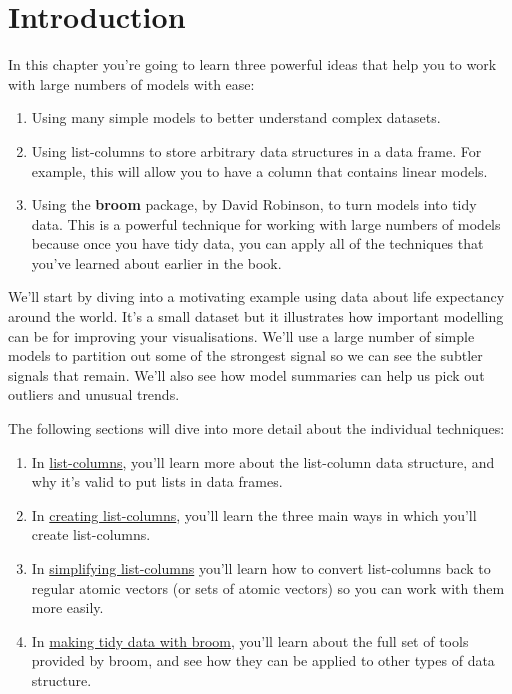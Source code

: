 \documentclass[]{book}
\begin{document}
\section{Introduction}\label{introduction-17}

In this chapter you're going to learn three powerful ideas that help you
to work with large numbers of models with ease:

\begin{enumerate}
\def\labelenumi{\arabic{enumi}.}
\item
  Using many simple models to better understand complex datasets.
\item
  Using list-columns to store arbitrary data structures in a data frame.
  For example, this will allow you to have a column that contains linear
  models.
\item
  Using the \textbf{broom} package, by David Robinson, to turn models
  into tidy data. This is a powerful technique for working with large
  numbers of models because once you have tidy data, you can apply all
  of the techniques that you've learned about earlier in the book.
\end{enumerate}

We'll start by diving into a motivating example using data about life
expectancy around the world. It's a small dataset but it illustrates how
important modelling can be for improving your visualisations. We'll use
a large number of simple models to partition out some of the strongest
signal so we can see the subtler signals that remain. We'll also see how
model summaries can help us pick out outliers and unusual trends.

The following sections will dive into more detail about the individual
techniques:

\begin{enumerate}
\def\labelenumi{\arabic{enumi}.}
\item
  In \protect\hyperlink{list-columns-1}{list-columns}, you'll learn more
  about the list-column data structure, and why it's valid to put lists
  in data frames.
\item
  In \protect\hyperlink{creating-list-columns}{creating list-columns},
  you'll learn the three main ways in which you'll create list-columns.
\item
  In \protect\hyperlink{simplifying-list-columns}{simplifying
  list-columns} you'll learn how to convert list-columns back to regular
  atomic vectors (or sets of atomic vectors) so you can work with them
  more easily.
\item
  In \protect\hyperlink{making-tidy-data-with-broom}{making tidy data
  with broom}, you'll learn about the full set of tools provided by
  broom, and see how they can be applied to other types of data
  structure.
\end{enumerate}
\end{document}
